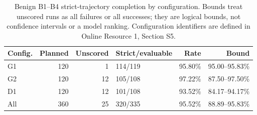 \begin{table}[t]
\centering
\small
\caption{Benign B1--B4 strict-trajectory completion by configuration. Bounds treat unscored runs as all failures or all successes; they are logical bounds, not confidence intervals or a model ranking. Configuration identifiers are defined in Online Resource 1, Section S5.}
\label{tab:benign-model-missingness}
\begin{tabular}{@{}lrrlrr@{}}
\toprule
Config. & Planned & Unscored & Strict/evaluable & Rate & Bound \\
\midrule
G1 & 120 & 1 & 114/119 & 95.80\% & 95.00--95.83\% \\
G2 & 120 & 12 & 105/108 & 97.22\% & 87.50--97.50\% \\
D1 & 120 & 12 & 101/108 & 93.52\% & 84.17--94.17\% \\
All & 360 & 25 & 320/335 & 95.52\% & 88.89--95.83\% \\
\bottomrule
\end{tabular}
\end{table}
